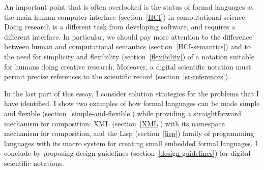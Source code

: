 An important point that is often overlooked is the status of formal languages  as the main human-computer interface (section~\ref{HCI}) in computational science. Doing research is a different task from developing software, and requires a different interface. In particular, we should pay more attention to the difference between human and computational semantics (section~\ref{HCI-semantics}) and to the need for simplicity and flexibility (section~\ref{flexibility}) of a notation suitable for humans doing creative research. Moreover, a digital scientific notation must permit precise references to the scientific record (section~\ref{sr-references}).

In the last part of this essay, I consider solution strategies for the problems that I have identified. I show two examples of how formal languages can be made simple and flexible (section~\ref{simple-and-flexible}) while providing a straightforward mechanism for composition: XML (section~\ref{XML}) with its namespace mechanism for composition, and the Lisp (section~\ref{lisp}) family of programming languages with its macro system for creating small embedded formal languages. I conclude by proposing design guidelines (section~\ref{design-guidelines}) for digital scientific notations.